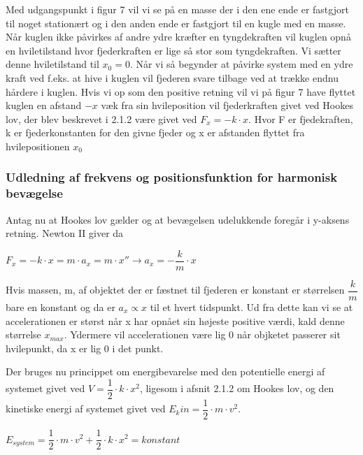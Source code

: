\documentclass[12pt,a4paper]{article}
\theoremstyle{break}
\theoremstyle{nonumberplain}
\begin{document}
Med udgangspunkt i figur 7 vil vi se på en masse der i den ene ende er fastgjort til noget stationært og i den anden ende er fastgjort til en kugle med en masse. Når kuglen ikke påvirkes af andre ydre kræfter en tyngdekraften vil kuglen opnå en hviletilstand hvor fjederkraften er lige så stor som tyngdekraften. Vi sætter denne hviletilstand til $x_0=0$. Når vi så begynder at påvirke system med en ydre kraft ved f.eks. at hive i kuglen vil fjederen svare tilbage ved at trække endnu hårdere i kuglen. Hvis vi op som den positive retning vil vi på figur 7 have flyttet kuglen en afstand $-x$ væk fra sin hvileposition vil fjederkraften givet ved Hookes lov, der blev beskrevet i 2.1.2 være givet ved $F_x=-k \cdot x$. Hvor F er fjedekraften, k er fjederkonstanten for den givne fjeder og x er afstanden flyttet fra hvilepositionen $x_0$
\\

\subsubsection{Udledning af frekvens og positionsfunktion for harmonisk bevægelse}

Antag nu at Hookes lov gælder og at bevægelsen udelukkende foregår i y-aksens retning. Newton II giver da 

\bigskip

\begin{center}
$F_x = -k \cdot x = m \cdot a_x = m \cdot x'' \rightarrow a_x = -\dfrac{k}{m} \cdot x$
\end{center}

\bigskip

Hvis massen, m, af objektet der er fæstnet til fjederen er konstant er størrelsen $\dfrac{k}{m}$ bare en konstant og da er $a_x \propto x$ til et hvert tidspunkt. Ud fra dette kan vi se at accelerationen er størst når x har opnået sin højeste positive værdi, kald denne størrelse $x_{max}$. Ydermere vil accelerationen være lig 0 når objketet passerer sit hvilepunkt, da x er lig 0 i det punkt.
\pagebreak

Der bruges nu princippet om energibevarelse med den potentielle energi af systemet givet ved $V=\dfrac{1}{2} \cdot k \cdot x^2$, ligesom i afsnit 2.1.2 om Hookes lov, og den kinetiske energi af systemet givet ved $E_kin = \dfrac{1}{2} \cdot m \cdot v^2$.

\bigskip

\begin{center}
$E_{system}=\dfrac{1}{2} \cdot m \cdot v^2 + \dfrac{1}{2} \cdot k \cdot x^2 = konstant$
\end{center}
\end{document}
